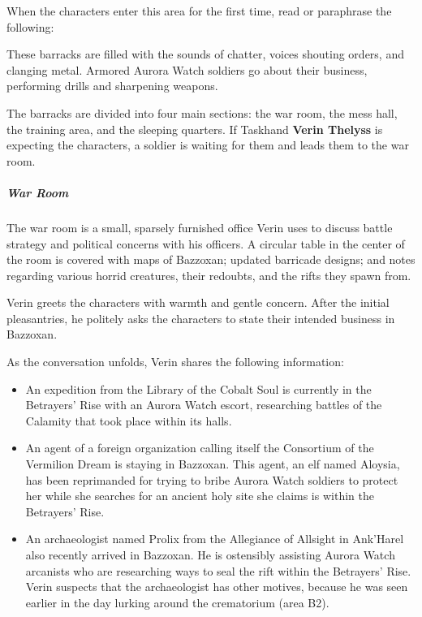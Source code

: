 \documentclass[10pt,a4paper,twoside,bg=print,twocolumn,openany,nodeprecatedcode]{dndbook}
\begin{document}
When the characters enter this area for the first time, read or paraphrase the following:

\begin{DndReadAloud}{}
These barracks are filled with the sounds of chatter, voices shouting orders, and clanging metal. Armored Aurora Watch soldiers go about their business, performing drills and sharpening weapons.

\end{DndReadAloud}

The barracks are divided into four main sections: the war room, the mess hall, the training area, and the sleeping quarters. If Taskhand \textbf{Verin Thelyss} is expecting the characters, a soldier is waiting for them and leads them to the war room.

\subparagraph{War Room}
The war room is a small, sparsely furnished office Verin uses to discuss battle strategy and political concerns with his officers. A circular table in the center of the room is covered with maps of Bazzoxan; updated barricade designs; and notes regarding various horrid creatures, their redoubts, and the rifts they spawn from.

Verin greets the characters with warmth and gentle concern. After the initial pleasantries, he politely asks the characters to state their intended business in Bazzoxan.

As the conversation unfolds, Verin shares the following information:


\begin{itemize}
\item An expedition from the Library of the Cobalt Soul is currently in the Betrayers' Rise with an Aurora Watch escort, researching battles of the Calamity that took place within its halls.
\item An agent of a foreign organization calling itself the Consortium of the Vermilion Dream is staying in Bazzoxan. This agent, an elf named Aloysia, has been reprimanded for trying to bribe Aurora Watch soldiers to protect her while she searches for an ancient holy site she claims is within the Betrayers' Rise.
\item An archaeologist named Prolix from the Allegiance of Allsight in Ank'Harel also recently arrived in Bazzoxan. He is ostensibly assisting Aurora Watch arcanists who are researching ways to seal the rift within the Betrayers' Rise. Verin suspects that the archaeologist has other motives, because he was seen earlier in the day lurking around the crematorium (area B2).
\end{itemize}
\end{document}
